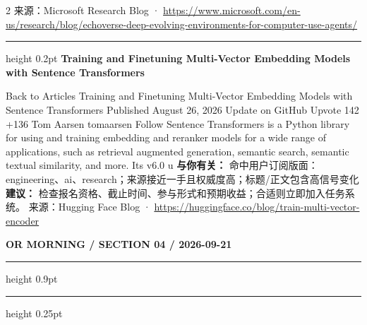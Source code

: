 \documentclass[10.5pt]{ctexart}
\begin{document}
\begin{multicols}{2}
{\footnotesize\color{ormuted} 来源：Microsoft Research Blog · \url{https://www.microsoft.com/en-us/research/blog/echoverse-deep-evolving-environments-for-computer-use-agents/}}
\vspace{2mm}
\hrule height 0.2pt
\vspace{2mm}
{\large\bfseries Training and Finetuning Multi-Vector Embedding Models with Sentence Transformers}\par
Back to Articles Training and Finetuning Multi-Vector Embedding Models with Sentence Transformers Published August 26, 2026 Update on GitHub Upvote 142 +136 Tom Aarsen tomaarsen Follow Sentence Transformers is a Python library for using and training embedding and reranker models for a wide range of applications, such as retrieval augmented generation, semantic search, semantic textual similarity, and more. Its v6.0 u
\textbf{与你有关：} 命中用户订阅版面：engineering、ai、research；来源接近一手且权威度高；标题/正文包含高信号变化
\textbf{建议：} 检查报名资格、截止时间、参与形式和预期收益；合适则立即加入任务系统。
{\footnotesize\color{ormuted} 来源：Hugging Face Blog · \url{https://huggingface.co/blog/train-multi-vector-encoder}}
\end{multicols}
\newpage
{\small\bfseries OR MORNING / SECTION 04 / 2026-09-21}
\vspace{2mm}
\hrule height 0.9pt
\vspace{1.5mm}
\hrule height 0.25pt
\vspace{4mm}
\end{document}

